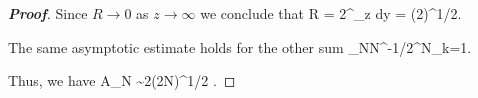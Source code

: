 \begin{proof}[\bf Proof]
Since $R\to 0$ as $z\to \infty$ we conclude that
\be
R = 2\int^\infty_z \exp{} dy = (2\pi)^{1/2}.
\ee

The same asymptotic estimate holds for the other sum
\be
\lim_{N\to \infty}N^{-1/2}\sum^N_{k=1}\pro{}.
\ee

Thus, we have
\be
\E A_N \sim 2(2\pi N)^{1/2} .
\ee
\end{proof}

